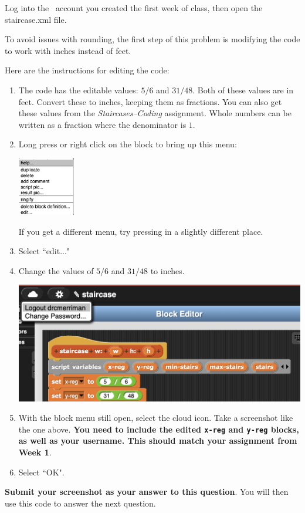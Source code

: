 \documentclass[handout,nooutcomes,noauthor,hints]{../ximera}
\begin{document}
\begin{question}\label{instructions}
Log into the \snap\ account you created the first week of class, then open the staircase.xml file.

To avoid issues with rounding, the first step of this problem is modifying the code to work with inches instead of feet.
 
Here are the instructions for editing the code:
\begin{enumerate}
 \item The code has the editable values: $5/6$ and $31/48$. Both of these values are in feet. Convert these to inches, keeping them as fractions. You can also get these values from the \emph{Staircases--Coding} assignment. Whole numbers can be written as a fraction where the denominator is $1$.
 \item Long press or right click on the block to bring up this menu: 
 
 \includegraphics[height=1in]{snapmenu}
 
If you get a different menu, try pressing in a slightly different place. 
\item Select ``edit..." 
\item Change the values of $5/6$ and $31/48$ to inches.

\includegraphics[width=.4\textwidth]{snapscreenshot}

\item With the block menu still open, select the cloud icon. Take a screenshot like the one above. \textbf{You need to include the edited \texttt{x-reg} and \texttt{y-reg} blocks, as well as your username. This should match your assignment from Week 1}.

\item Select ``OK".
\end{enumerate}

\textbf{Submit your screenshot as your answer to this question}. You will then use this code to answer the next question.
\end{question}
\end{document}
